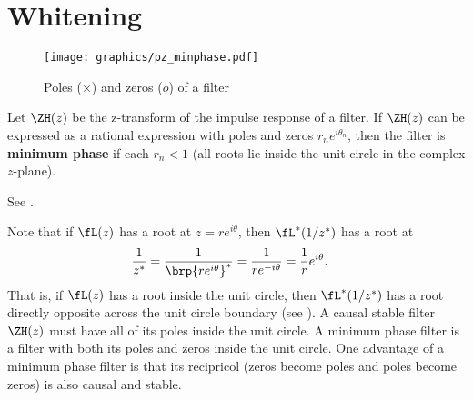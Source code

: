 \section{Whitening}
\label{sec:d-whiten}
\begin{figure}[h]
  \centering
  \texttt{[image: graphics/pz\_minphase.pdf]}
  \caption{
     Poles ($\times$) and zeros ($o$) of a  filter
     \label{fig:w_pz_minphase}
     }
\end{figure}
\begin{definition}
Let $\ZH(z)$ be the z-transform of the impulse response of a filter.
If $\ZH(z)$ can be expressed as a rational expression with poles and zeros
$r_ne^{i\theta_n}$,
then the filter is \textbf{minimum phase} if each $r_n<1$
(all roots lie inside the unit circle in the complex $z$-plane).
\end{definition}
See .

Note that if $\fL(z)$ has a root at $z=re^{i\theta}$, then
$\fL^\ast(1/z^\ast)$ has a root at
\begin{align*}
   \frac{1}{z^\ast}
     &= \frac{1}{\brp{re^{i\theta}}^\ast}
      = \frac{1}{re^{-i\theta}}
      = \frac{1}{r} e^{i\theta}.
\end{align*}
That is, if $\fL(z)$ has a root inside the unit circle,
then $\fL^\ast(1/z^\ast)$ has a root directly opposite across the unit circle
boundary (see ).
A causal stable filter $\ZH(z)$ must have all of its poles inside
the unit circle.
A minimum phase filter is a filter with both its poles and zeros inside the
unit circle.
One advantage of a minimum phase filter is that its recipricol
(zeros become poles and poles become zeros)
is also causal and stable.

